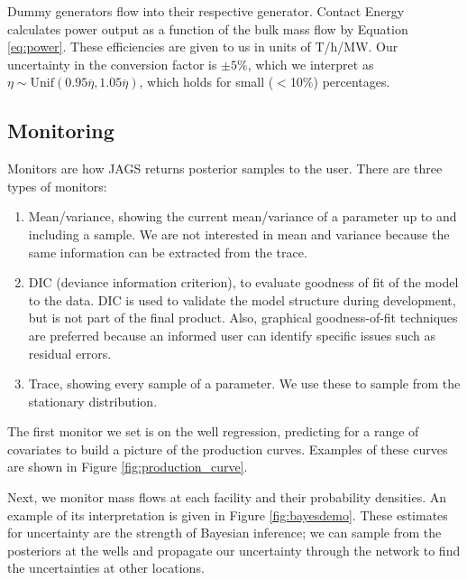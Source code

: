 \documentclass[a4paper, 12pt]{article}
\begin{document}
Dummy generators flow into their respective generator. Contact Energy calculates power output as a function of the bulk mass flow by Equation \ref{eq:power}. These efficiencies are given to us in units of T/h/MW. Our uncertainty in the conversion factor is $\pm5\%$, which we interpret as $\eta \sim \text{Unif}\left( 0.95\overline\eta, 1.05\overline\eta \right)$, which holds for small ($<$10\%) percentages.

\subsection{Monitoring}

Monitors are how JAGS returns posterior samples to the user. There are three types of monitors:

\begin{enumerate}
\item Mean/variance, showing the current mean/variance of a parameter up to and including a sample. We are not interested in mean and variance because the same information can be extracted from the trace.
\item DIC (deviance information criterion), to evaluate goodness of fit of the model to the data. DIC is used to validate the model structure during development, but is not part of the final product. Also, graphical goodness-of-fit techniques are preferred because an informed user can identify specific issues such as residual errors.
\item Trace, showing every sample of a parameter. We use these to sample from the stationary distribution.
\end{enumerate}

The first monitor we set is on the well regression, predicting for a range of covariates to build a picture of the production curves. Examples of these curves are shown in Figure \ref{fig:production_curve}.

Next, we monitor mass flows at each facility and their probability densities. An example of its interpretation is given in Figure \ref{fig:bayesdemo}. These estimates for uncertainty are the strength of Bayesian inference; we can sample from the posteriors at the wells and propagate our uncertainty through the network to find the uncertainties at other locations.
\end{document}
